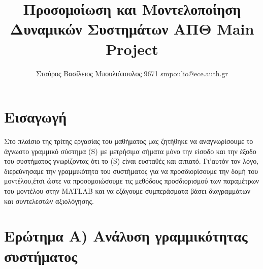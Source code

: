 \documentclass{article}
\title{Προσομοίωση και Μοντελοποίηση Δυναμικών Συστημάτων ΑΠΘ Main Project}
\author{Σταύρος Βασίλειος Μπουλιόπουλος 9671 smpoulio@ece.auth.gr}
\begin{document}
\maketitle


\section{Εισαγωγή}

Στο πλαίσιο της τρίτης εργασίας του μαθήματος μας ζητήθηκε να αναγνωρίσουμε το άγνωστο γραμμικό σύστημα (S) με μετρήσιμα σήματα μόνο την είσοδο και την έξοδο του συστήματος γνωρίζοντας ότι το (S) είναι ευσταθές και αιτιατό. Γι'αυτόν τον λόγο, διερεύνησαμε την γραμμικότητα του συστήματος για να προσδιορίσουμε την δομή του μοντέλου,έτσι ώστε να προσομοιώσουμε τις μεθόδους προσδιορισμού των παραμέτρων του μοντέλου στην MATLAB και να εξάγουμε συμπεράσματα βάσει διαγραμμάτων και συντελεστών αξιολόγησης. 

\begin{center}

\end{center}



 

\section{Ερώτημα Α) Ανάλυση γραμμικότητας συστήματος}
\end{document}
